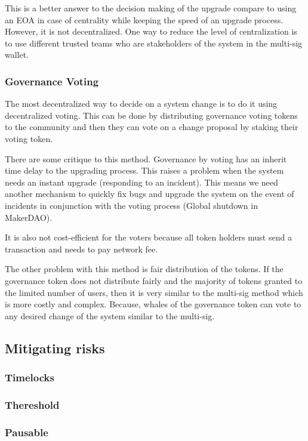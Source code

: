  This is a better answer to the decision making of the upgrade compare to using an EOA in case of centrality while keeping the speed of an upgrade process. However, it is not decentralized. One way to reduce the level of centralization is to use different trusted teams who are stakeholders of the system in the multi-sig wallet. 


\subsubsection{Governance Voting}
The most decentralized way to decide on a system change is to do it using decentralized voting. This can be done by distributing governance voting tokens to the community and then they can vote on a change proposal by staking their voting token. 

There are some critique to this method. Governance by voting has an inherit time delay to the upgrading process. This raises a problem when the system needs an instant upgrade (\eg responding to an incident). This means we need another mechanism to quickly fix bugs and upgrade the system on the event of incidents in conjunction with the voting process (\eg Global shutdown in MakerDAO).

It is also not cost-efficient for the voters because all token holders must send a transaction and needs to pay network fee.

The other problem with this method is fair distribution of the tokens. If the governance token does not distribute fairly and the majority of tokens granted to the limited number of users, then it is very similar to the multi-sig method which is more costly and complex. Because, whales of the governance token can vote to any desired change of the system similar to the multi-sig.
 

\subsection{Mitigating risks}

\subsubsection{Timelocks}

\subsubsection{Thereshold}

\subsubsection{Pausable}

